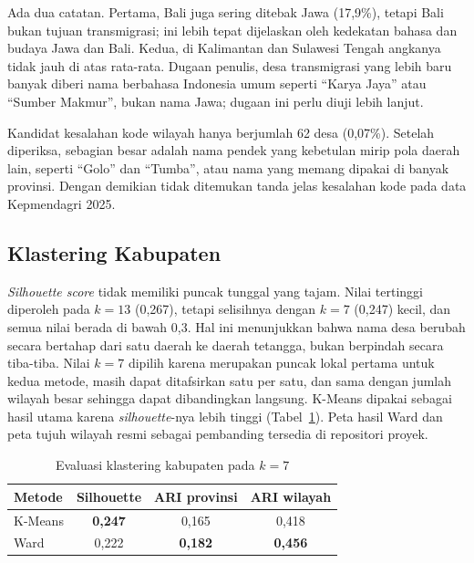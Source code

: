 \documentclass[conference]{IEEEtran}
\begin{document}
Ada dua catatan. Pertama, Bali juga sering ditebak Jawa (17,9\%), tetapi Bali bukan tujuan transmigrasi; ini lebih tepat dijelaskan oleh kedekatan bahasa dan budaya Jawa dan Bali. Kedua, di Kalimantan dan Sulawesi Tengah angkanya tidak jauh di atas rata-rata. Dugaan penulis, desa transmigrasi yang lebih baru banyak diberi nama berbahasa Indonesia umum seperti ``Karya Jaya'' atau ``Sumber Makmur'', bukan nama Jawa; dugaan ini perlu diuji lebih lanjut.

Kandidat kesalahan kode wilayah hanya berjumlah 62 desa (0,07\%). Setelah diperiksa, sebagian besar adalah nama pendek yang kebetulan mirip pola daerah lain, seperti ``Golo'' dan ``Tumba'', atau nama yang memang dipakai di banyak provinsi. Dengan demikian tidak ditemukan tanda jelas kesalahan kode pada data Kepmendagri 2025.

\subsection{Klastering Kabupaten}

\textit{Silhouette score} tidak memiliki puncak tunggal yang tajam. Nilai tertinggi diperoleh pada $k = 13$ (0,267), tetapi selisihnya dengan $k = 7$ (0,247) kecil, dan semua nilai berada di bawah 0,3. Hal ini menunjukkan bahwa nama desa berubah secara bertahap dari satu daerah ke daerah tetangga, bukan berpindah secara tiba-tiba. Nilai $k = 7$ dipilih karena merupakan puncak lokal pertama untuk kedua metode, masih dapat ditafsirkan satu per satu, dan sama dengan jumlah wilayah besar sehingga dapat dibandingkan langsung. K-Means dipakai sebagai hasil utama karena \textit{silhouette}-nya lebih tinggi (Tabel~\ref{tab:klaster}). Peta hasil Ward dan peta tujuh wilayah resmi sebagai pembanding tersedia di repositori proyek.

\begin{table}[!t]
\caption{Evaluasi klastering kabupaten pada $k = 7$}
\label{tab:klaster}
\centering
\begin{tabular}{lccc}
\toprule
Metode & Silhouette & ARI provinsi & ARI wilayah \\
\midrule
K-Means & \textbf{0,247} & 0,165 & 0,418 \\
Ward & 0,222 & \textbf{0,182} & \textbf{0,456} \\
\bottomrule
\end{tabular}
\end{table}
\end{document}
